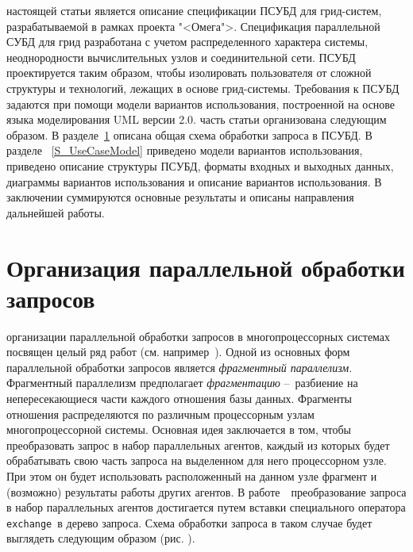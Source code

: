 \documentclass[11pt,oneside]{article}
\begin{document}
	 настоящей статьи является описание спецификации ПСУБД для грид-систем, разрабатываемой в рамках проекта "<Омега">\cite{B_OMEGA}. Спецификация параллельной СУБД для грид разработана с учетом распределенного характера системы, неоднородности вычислительных узлов и соединительной сети. ПСУБД проектируется таким образом, чтобы изолировать пользователя от сложной структуры и технологий, лежащих в основе грид-системы. Требования к ПСУБД задаются при помощи модели вариантов использования, построенной на основе языка моделирования UML версии 2.0.
	 часть статьи организована следующим образом. В разделе~\ref{S_ParQueryProcessing} описана общая схема обработки запроса в ПСУБД. В разделе ~\ref{S_UseCaseModel} приведено модели вариантов использования, приведено описание структуры ПСУБД, форматы входных и выходных данных, диаграммы вариантов использования и описание вариантов использования. В заключении суммируются основные результаты и описаны направления дальнейшей работы.
	
	\section{Организация параллельной обработки запросов}\label{S_ParQueryProcessing}
	 организации параллельной обработки запросов в многопроцессорных системах посвящен целый ряд работ (см. например~\cite{B_Sokolinsky2001, B_Aloisio2005, B_Dutra2004}). Одной из основных форм параллельной обработки запросов является \textit{фрагментный параллелизм}. Фрагментный параллелизм предполагает \textit{фрагментацию} \---~разбиение на непересекающиеся части каждого отношения базы данных. Фрагменты отношения распределяются по различным процессорным узлам многопроцессорной системы. Основная идея заключается в том, чтобы преобразовать запрос в набор параллельных агентов, каждый из которых будет обрабатывать свою часть запроса на выделенном для него процессорном узле. При этом он будет использовать расположенный на данном узле фрагмент и (возможно) результаты работы других агентов. В работе~\cite{B_Sokolinsky2001}~преобразование запроса в набор параллельных агентов достигается путем вставки специального оператора \texttt{exchange}~в дерево запроса. Схема обработки запроса в таком случае будет выглядеть следующим образом (рис.
	).
	
	
\end{document}
